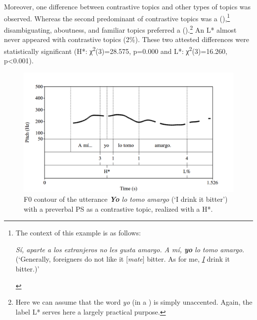 \documentclass[output=paper]{langsci/langscibook}
\begin{document}
  



Moreover, one difference between contrastive topics and other types of topics was observed. Whereas the second predominant  of contrastive topics was a  (),\footnote{The context of this example is as follows:
\begin{exe}
 \textit{Sí, aparte a los extranjeros no les gusta amargo. A mí, \textbf{yo} lo tomo amargo.}\\
(‘Generally, foreigners do not like it {[}\textit{mate}{]} bitter. As for me, \textit{\uline{I}} drink it bitter.)’
\end{exe}\vspace*{-\baselineskip}} disambiguating, aboutness, and familiar topics preferred a  ().\footnote{Here we can assume that the word \textit{yo} (in a ) is simply unaccented. Again, the label L* serves here a largely practical purpose.} An L* almost never appeared with contrastive topics (2\%). These two attested differences were statistically significant (H*: χ\textsuperscript{2}(3)=28.575, p=0.000 and L*: χ\textsuperscript{2}(3)=16.260, p<0.001).

\begin{figure}
\includegraphics[width=\textwidth]{figures/pes-img17.png}
\caption{F0 contour of the utterance \textit{\textbf{Yo} lo tomo amargo} (‘I drink it bitter’) with a preverbal PS as a contrastive topic, realized with a H*.\label{fig:pes:17}}
 \end{figure} 
\end{document}
